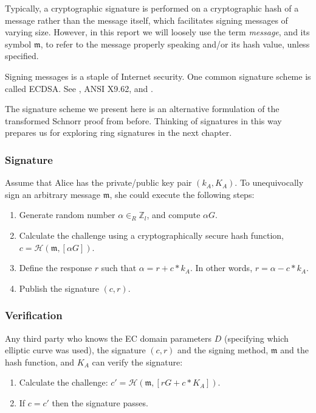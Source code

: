 Typically, a cryptographic signature is performed on a cryptographic hash of a message rather than the message itself, which facilitates signing messages of varying size. However, in this report we will loosely use the term {\em message}, and its symbol $\mathfrak{m}$, to refer to the message properly speaking and/or its hash value, unless specified.

Signing messages is a staple of Internet security. One common signature scheme is called ECDSA. See \cite{ecdsa}, ANSI X9.62, and \cite{Hankerson:2003:GEC:940321}.

The signature scheme we present here is an alternative formulation of the transformed Schnorr proof from before. Thinking of signatures in this way prepares us for exploring ring signatures in the next chapter.


\subsubsection*{Signature}

Assume that Alice has the private/public key pair \((k_A, K_A)\). To unequivocally sign an arbitrary message $\mathfrak{m}$, she could execute the following steps:

\begin{enumerate}
	\item Generate random number $\alpha \in_R \mathbb{Z}_l$, and compute $\alpha G$.
	\item Calculate the challenge using a cryptographically secure hash function, \(c = \mathcal{H}(\mathfrak{m},[\alpha G])\).
	\item Define the response $r$ such that $\alpha = r + c*k_A$. In other words, $r = \alpha - c*k_A$.
	\item Publish the signature $(c, r)$.
\end{enumerate}


\subsubsection*{Verification}

Any third party who knows the EC domain parameters $D$ (specifying which elliptic curve was used), the signature $(c, r)$ and the signing method, $\mathfrak{m}$ and the hash function, and $K_A$ can verify the signature:

\begin{enumerate}
	\item Calculate the challenge: \(c' = \mathcal{H}(\mathfrak{m},[r G + c*K_A])\).
	\item If $c = c'$ then the signature passes.
\end{enumerate}

